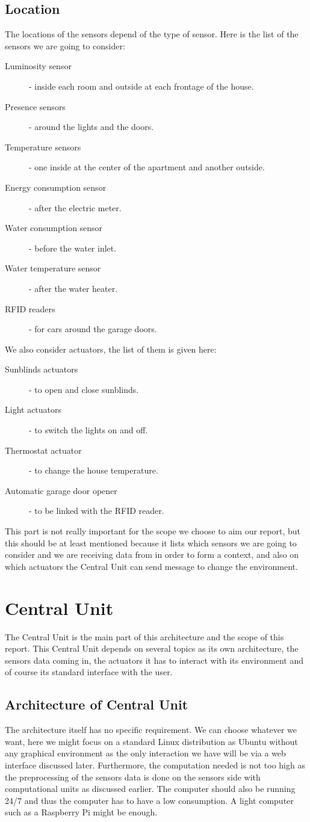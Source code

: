 \documentclass{acm_proc_article-sp}
\begin{document}
\subsection{Location}
The locations of the sensors depend of the type of sensor. Here is the list of the sensors we are going to consider:
\begin{description}
 \item[Luminosity sensor] - inside each room and outside at each frontage of the house.
 \item[Presence sensors] - around the lights and the doors.
 \item[Temperature sensors] - one inside at the center of the apartment and another outside.
 \item[Energy consumption sensor] - after the electric meter.
 \item[Water consumption sensor] - before the water inlet.
 \item[Water temperature sensor] - after the water heater.
 \item[RFID readers] - for cars around the garage doors.
\end{description}
We also consider actuators, the list of them is given here:
\begin{description}
 \item[Sunblinds actuators] - to open and close sunblinds.
 \item[Light actuators] - to switch the lights on and off.
 \item[Thermostat actuator] - to change the house temperature.
 \item[Automatic garage door opener] - to be linked with the RFID reader.
\end{description}
This part is not really important for the scope we choose to aim our report, but this should be at least mentioned because it lists which sensors we are going to consider and we are receiving data from in order to form a context, and also on which actuators the Central Unit can send message to change the environment.
\section{Central Unit}	
The Central Unit is the main part of this architecture and the scope of this report. 
This Central Unit depends on several topics as its own architecture, the sensors data coming in, 
the actuators it has to interact with its environment and of course its standard interface with the user.
\subsection{Architecture of Central Unit}
The architecture itself has no specific requirement. 
We can choose whatever we want, here we might focus on a standard Linux distribution as Ubuntu without any graphical environment as the only interaction we have will be via a web interface discussed later. 
Furthermore, the computation needed is not too high as the preprocessing of the sensors data is done on the sensors side with computational units as discussed earlier. 
The computer should also be running 24/7 and thus the computer has to have a low consumption. A light computer such as a Raspberry Pi might be enough.
\end{document}

